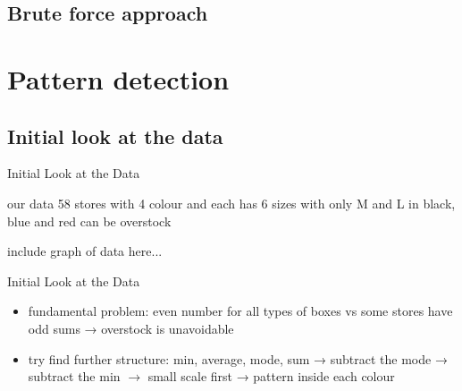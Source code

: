 \documentclass{beamer}
\begin{document}
\subsection{Brute force approach}



\section{Pattern detection}


\subsection{Initial look at the data}

\begin{frame}{Initial Look at the Data}
\begin{block}{our data}
	58 stores with 4 colour and each has 6 sizes with only M and L in black, blue and red can be overstock 
\end{block}
include graph of data here...
\end{frame}

\begin{frame}{Initial Look at the Data}
 \begin{itemize}
	\item fundamental problem: 
	even number for all types of boxes vs some stores have odd sums → overstock is unavoidable
	\item try find further structure:
	min, average, mode, sum → subtract the mode → subtract the min $\rightarrow$ small scale first → pattern inside each colour
\end{itemize}
\end{frame}
\end{document}

